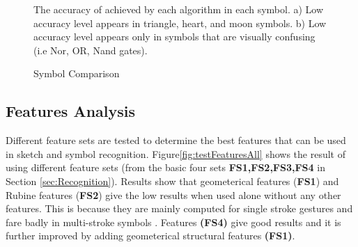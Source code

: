 \documentclass[preprint,10pt,5p,twocolumn]{elsarticle}
\begin{document}
\begin{figure} 
	\centering 
	\caption {Symbol Comparison} The accuracy of achieved by each algorithm in each symbol. a) Low accuracy level appears in triangle, heart, and moon symbols. b) Low accuracy level appears only in symbols that are visually confusing (i.e Nor, OR, Nand gates). 
\end{figure}  
\begin{table}
	\centering
 
	\caption{Confusion Matrix of Hs-DS}
	\label{tab:ConfusionMatrix}
\end{table}
 \subsection{Features Analysis}
\label{sec:featexp}
Different feature sets are tested to determine the best features that can be used in sketch and symbol recognition. Figure\ref{fig:testFeaturesAll} shows the result of using different feature sets (from the basic four sets \textbf{FS1,FS2,FS3,FS4} in Section \ref{sec:Recognition}). Results show that geometerical features (\textbf{FS1}) and Rubine features (\textbf{FS2}) \cite{gestureexample12} give the low results when used alone without any other features. This is because they are mainly computed for single stroke gestures and fare badly in multi-stroke symbols \cite{compareFeaturSVM}. Features \textbf{(FS4)} give good results and it is further improved by adding geometerical structural features \textbf{(FS1)}.
\end{document}

